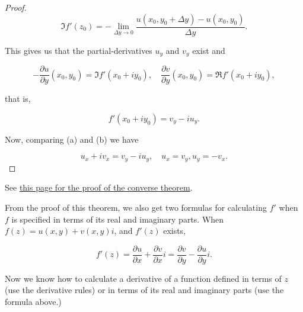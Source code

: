 \documentclass{article}
\begin{document}
\begin{proof}
\[ \Im{f'(z_0)} = - \lim_{\Delta y \to 0} \frac{u(x_0, y_0 + \Delta y) - u(x_0, y_0)}{\Delta y}. \]

This gives us that the \@{partial-derivatives} $u_y$ and $v_y$ exist and

\[ - \frac{\partial u}{\partial y}(x_0, y_0) = \Im f'(x_0 + i y_0), \quad \frac{\partial v}{\partial y}(x_0, y_0) = \Re f'(x_0 + i y_0), \]

that is,

\[ f'(x_0 + i y_0) = v_y - i u_y. \tag{b} \]

Now, comparing (a) and (b) we have

\[ u_x + i v_x = v_y - i u_y, \quad u_x = v_y, u_y = - v_x. \]
\end{proof}

See \href{https://personal.math.ubc.ca/~feldman/m300/cauchyRiemann.pdf}{this page for the proof of the converse theorem}.

\begin{note}
From the proof of this theorem, we also get two formulas for calculating $f'$ when $f$ is specified in terms of its real and imaginary parts. When $f(z) = u(x,y) + v(x,y)i$, and $f'(z)$ exists,

\[ f'(z) = \frac{\partial u}{\partial x} + \frac{\partial v}{\partial x}i = \frac{\partial v}{\partial y} - \frac{\partial u}{\partial y}i. \]
\end{note}

\begin{remark}
Now we know how to calculate a derivative of a function defined in terms of $z$ (use the derivative rules) or in terms of its real and imaginary parts (use the formula above.)
\end{remark}
\end{document}
